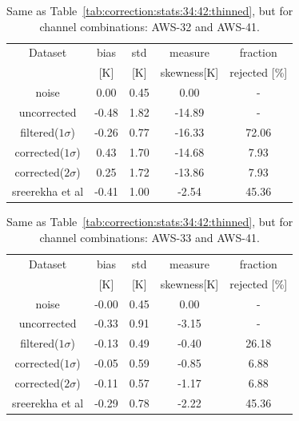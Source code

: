 \documentclass[12pt]{article}
\begin{document}
\begin{table}[!bt]
	\centering
	\begin{tabular}[b]{c|c|c|c|c}
		Dataset  		  &   bias &   std &   measure & fraction \\
							&   [K]  &   [K] & skewness[K] & rejected [\%]\\
		\hline
noise             		&   0.00 &  0.45 &               0.00 &                - \\
uncorrected       		&  -0.48 &  1.82 &             -14.89 &                - \\
filtered($1\sigma$)  	&  -0.26 &  0.77 &             -16.33 &               72.06 \\
corrected($1\sigma$) 	&   0.43 &  1.70 &             -14.68 &                7.93 \\
corrected($2\sigma$) 	&   0.25 &  1.72 &             -13.86 &                7.93 \\
sreerekha et al   		&  -0.41 &  1.00 &              -2.54 &               45.36 \\
		\hline
	\end{tabular}
	\caption{Same as Table~\ref{tab:correction:stats:34:42:thinned}, but for channel combinations: AWS-32 and AWS-41.   }
	\label{tab:correction:stats:32:41}
\end{table}

\begin{table}[!bt]
	\centering
	\begin{tabular}[b]{c|c|c|c|c}
		Dataset  		  &   bias &   std &   measure  & fraction\\
						&   [K]  &   [K] & skewness[K]  & rejected [\%]\\
		\hline
	noise       	    	&  -0.00 &  0.45 &               0.00 &               - \\
	uncorrected	    		&  -0.33 &  0.91 &              -3.15 &                - \\
	filtered($1\sigma$)  	&  -0.13 &  0.49 &              -0.40 &               26.18 \\
	corrected($1\sigma$) 	&  -0.05 &  0.59 &              -0.85 &                6.88 \\
	corrected($2\sigma$) 	&  -0.11 &  0.57 &              -1.17 &                6.88 \\
	sreerekha et al   		&  -0.29 &  0.78 &              -2.22 &               45.36 \\
		\hline
	\end{tabular}
	\caption{Same as Table~\ref{tab:correction:stats:34:42:thinned}, but for channel combinations: AWS-33 and AWS-41.   }
	\label{tab:correction:stats:33:41}
\end{table}
\end{document}
